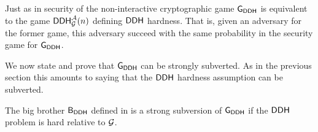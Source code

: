 Just as in  security of the non-interactive cryptographic game $\operatorname{\mathsf{G}}_{\mathsf{DDH}}$ is equivalent to the game $\mathsf{DDH}_{\operatorname{\mathcal{G}}}^{\mathcal{A}}(n)$ defining $\mathsf{DDH}$ hardness. That is, given an adversary for the former game, this adversary succeed with the same probability in the security game for $\operatorname{\mathsf{G}}_{\mathsf{DDH}}$. 

We now state and prove that $\operatorname{\mathsf{G}}_{\mathsf{DDH}}$ can be strongly subverted. As in the previous section this amounts to saying that the $\mathsf{DDH}$ hardness assumption can be subverted.

\begin{thm}
The big brother $\mathsf{B}_{\mathsf{DDH}}$ defined in  is a strong subversion of $\operatorname{\mathsf{G}}_{\mathsf{DDH}}$ if the $\mathsf{DDH}$ problem is hard relative to $\operatorname{\mathcal{G}}$.
\end{thm}

